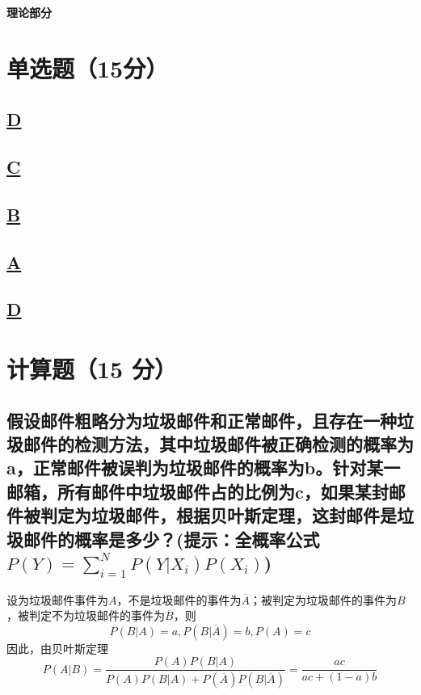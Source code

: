\documentclass[a4paper]{article}
\begin{document}
\courseheader
{}
\vspace{3mm}
\centerline{\textbf{\Large{理论部分}}}

\section{单选题（15分）}
\subsection{\underline{D}}

\subsection{\underline{C}}

\subsection{\underline{B}}

\subsection{\underline{A}}

\subsection{\underline{D}}

\section{计算题（15 分）}



\subsection{假设邮件粗略分为垃圾邮件和正常邮件，且存在一种垃圾邮件的检测方法，其中垃圾邮件被正确检测的概率为a，正常邮件被误判为垃圾邮件的概率为b。针对某一邮箱，所有邮件中垃圾邮件占的比例为c，如果某封邮件被判定为垃圾邮件，根据贝叶斯定理，这封邮件是垃圾邮件的概率是多少？\newline(提示：全概率公式$P(Y)=\sum^{N}_{i=1}P(Y|X_i)P(X_i)$)}
设为垃圾邮件事件为$ A $，不是垃圾邮件的事件为$ \overline{A} $；被判定为垃圾邮件的事件为$ B $，被判定不为垃圾邮件的事件为$ \overline{B} $，则
$$ P(B|A) = a, P(B|\overline{A}) = b, P(A) = c $$
因此，由贝叶斯定理
$$ P(A|B) = \frac{P(A)P(B|A)}{P(A)P(B|A) + P(\overline{A})P(B|\overline{A})} = \frac{ac}{ac + (1-a)b} $$
\end{document}
